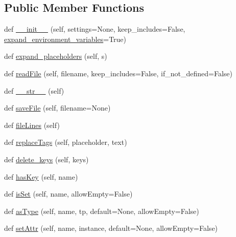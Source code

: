 \subsection*{Public Member Functions}
\begin{DoxyCompactItemize}
\item 
def \mbox{\hyperlink{classgetdist_1_1inifile_1_1IniFile_a374cd3d03770d05b19c9be86c76db3b0}{\+\_\+\+\_\+init\+\_\+\+\_\+}} (self, settings=None, keep\+\_\+includes=False, \mbox{\hyperlink{classgetdist_1_1inifile_1_1IniFile_ac800cfc0a6643c54893324e69ed3a7f6}{expand\+\_\+environment\+\_\+variables}}=True)
\item 
def \mbox{\hyperlink{classgetdist_1_1inifile_1_1IniFile_a6b54b80695289401d1538e9d17b2247d}{expand\+\_\+placeholders}} (self, s)
\item 
def \mbox{\hyperlink{classgetdist_1_1inifile_1_1IniFile_a732b3b9d1e3a91cf678a8f47019ed010}{read\+File}} (self, filename, keep\+\_\+includes=False, if\+\_\+not\+\_\+defined=False)
\item 
def \mbox{\hyperlink{classgetdist_1_1inifile_1_1IniFile_abeb83c5ee7c427d7d0aff5524450d539}{\+\_\+\+\_\+str\+\_\+\+\_\+}} (self)
\item 
def \mbox{\hyperlink{classgetdist_1_1inifile_1_1IniFile_ad61dd576303028a9327f483e5fe55c6e}{save\+File}} (self, filename=None)
\item 
def \mbox{\hyperlink{classgetdist_1_1inifile_1_1IniFile_a10320a346d83ec496b1f5afc243381c6}{file\+Lines}} (self)
\item 
def \mbox{\hyperlink{classgetdist_1_1inifile_1_1IniFile_a1517e8a2b5f681bd333fc9e3d2b5294e}{replace\+Tags}} (self, placeholder, text)
\item 
def \mbox{\hyperlink{classgetdist_1_1inifile_1_1IniFile_a72c9670bb1e927aae5eb0b31dc5fc1d7}{delete\+\_\+keys}} (self, keys)
\item 
def \mbox{\hyperlink{classgetdist_1_1inifile_1_1IniFile_ae6ecdb2f829ec8651442ca4f7a2f85cc}{has\+Key}} (self, name)
\item 
def \mbox{\hyperlink{classgetdist_1_1inifile_1_1IniFile_a12654a2e6bfd201d99e277bd6e1c6125}{is\+Set}} (self, name, allow\+Empty=False)
\item 
def \mbox{\hyperlink{classgetdist_1_1inifile_1_1IniFile_a2ebf8b8ec5ec2f4776284314ae4d2a75}{as\+Type}} (self, name, tp, default=None, allow\+Empty=False)
\item 
def \mbox{\hyperlink{classgetdist_1_1inifile_1_1IniFile_ab0aec3357b710594c342466f6c12762a}{set\+Attr}} (self, name, instance, default=None, allow\+Empty=False)

\end{DoxyCompactItemize}
